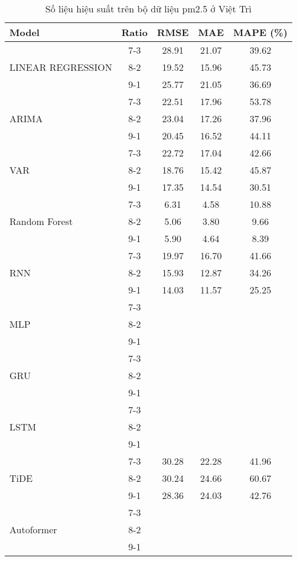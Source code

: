 \begin{table}[h!]
    \centering
    \caption{Số liệu hiệu suất trên bộ dữ liệu pm2.5 ở Việt Trì}
    \begin{tabular}{|l|c|c|c|c|}
    \hline
    \rowcolor{orange!30} \textbf{Model} & \textbf{Ratio} & \textbf{RMSE} & \textbf{MAE} & \textbf{MAPE (\%)} \\ \hline
    \rowcolor{white}  & 7-3 & 28.91 & 21.07 & 39.62 \\ 
    \rowcolor{white}  LINEAR REGRESSION & 8-2 & 19.52 & 15.96 & 45.73 \\ 
    \rowcolor{white}  & 9-1 & 25.77 & 21.05 & 36.69 \\ \hline
    \rowcolor{white}  & 7-3 & 22.51 & 17.96 & 53.78 \\ 
    \rowcolor{white} ARIMA & 8-2 & 23.04 & 17.26 & 37.96 \\
    \rowcolor{white}  & 9-1 & 20.45 & 16.52 & 44.11 \\ \hline
    \rowcolor{white}  & 7-3 & 22.72 & 17.04 & 42.66 \\ 
    \rowcolor{white} VAR & 8-2 & 18.76 & 15.42 & 45.87 \\ 
    \rowcolor{white}  & 9-1 & 17.35 & 14.54 & 30.51 \\ \hline
    \rowcolor{white} & 7-3 & 6.31 & 4.58 & 10.88 \\ 
    \rowcolor{white} Random Forest & 8-2 & 5.06 & 3.80 & 9.66 \\ 
    \rowcolor{white} & 9-1 & 5.90 & 4.64 & 8.39 \\ \hline
    \rowcolor{white}  & 7-3 & 19.97 & 16.70 & 41.66 \\ 
    \rowcolor{white} RNN & 8-2 & 15.93 & 12.87 & 34.26 \\ 
    \rowcolor{white}  & 9-1 & 14.03 & 11.57 & 25.25 \\ \hline
    \rowcolor{white} & 7-3 &  &  &  \\ 
    \rowcolor{white} MLP & 8-2 &  &  &  \\ 
    \rowcolor{white} & 9-1 &  &  &  \\ \hline
    \rowcolor{white} & 7-3 &  &  &  \\ 
    \rowcolor{white} GRU & 8-2 &  &  &  \\ 
    \rowcolor{white} & 9-1 &  &  &  \\ \hline
    \rowcolor{white} & 7-3 &  &  &  \\ 
    \rowcolor{white} LSTM & 8-2 &  &  &  \\ 
    \rowcolor{white} & 9-1 &  &  &  \\ \hline
    \rowcolor{white!30} & 7-3 & 30.28 & 22.28 & 41.96 \\ 
    \rowcolor{white!30} TiDE & 8-2 & 30.24 & 24.66 & 60.67 \\ 
    \rowcolor{white!30} & 9-1 & 28.36 & 24.03 & 42.76 \\ \hline
    \rowcolor{white} & 7-3 &  &  &  \\ 
    \rowcolor{white} Autoformer & 8-2 &  &  &  \\ 
    \rowcolor{white} & 9-1 &  &  &  \\ \hline

    \end{tabular}
\end{table}